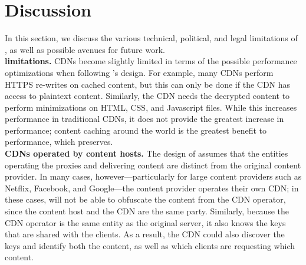 \section{Discussion}
\label{sec:discussion}
In this section, we discuss the various technical, political, and legal limitations
of \system{}, as well as possible avenues for future work. \\
\vspace{0pt}
\textbf{\system{} limitations.} CDNs become slightly limited in terms of the 
possible performance optimizations when following \system{}'s design.  For example, 
many CDNs perform HTTPS re-writes on cached content, but this can only be 
done if the CDN has access to plaintext content.  Similarly, the CDN needs the 
decrypted content to perform minimizations on HTML, CSS, and Javascript files.  While 
this increases performance in traditional CDNs, it does not provide the greatest 
increase in performance; content caching around the world is the greatest benefit to 
performance, which \system{} preserves.\\
\vspace{0pt}
\textbf{CDNs operated by content hosts.} The design of \system{}
assumes that the entities operating the proxies and delivering content are
distinct from the original content provider. In many cases, however---particularly
for large content providers such as Netflix, Facebook, and Google---the
content provider operates their own CDN; in these cases, \system{} will
not be able to obfuscate the content from the CDN operator, since the content host
and the CDN are the same party.  Similarly, because the CDN operator is the same
entity as the original server, it also knows the keys that are shared with the clients.
As a result, the CDN could also discover the keys and identify both
the content, as well as which clients are requesting which content.\\
\vspace{0pt}
